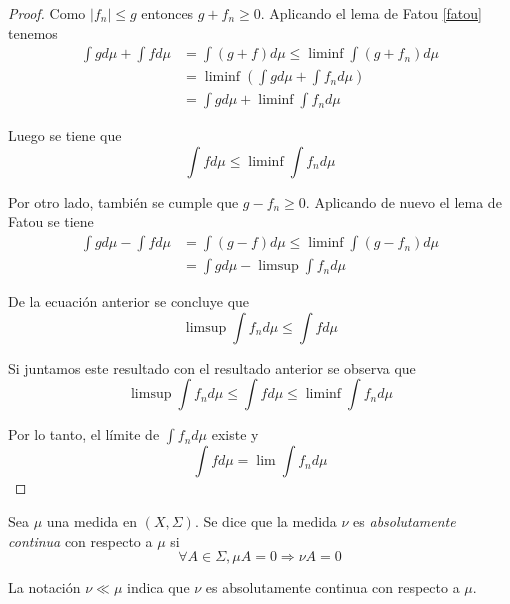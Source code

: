 \begin{proof}
	Como $|f_n| \leq g$ entonces $g + f_n \geq 0$. Aplicando el lema de Fatou \ref{fatou} tenemos
	\begin{align}
		\int g d\mu + \int f d\mu &= \int (g+f) d\mu \leq \liminf \int (g+f_n) d\mu\\
		&= \liminf \left( \int g d\mu + \int f_n d\mu \right)\\
		&= \int g d\mu + \liminf \int f_n d\mu
	\end{align}
	
	Luego se tiene que
	\begin{equation}
		\int f d\mu \leq \liminf \int f_n d\mu
	\end{equation}
	
	Por otro lado, también se cumple que $g - f_n \geq 0$. Aplicando de nuevo el lema de Fatou se tiene
	\begin{align}
		\int g d\mu - \int f d\mu &= \int (g-f) d\mu \leq \liminf \int (g - f_n) d\mu\\
		&= \int g d\mu - \limsup \int f_n d\mu
	\end{align}
	
	De la ecuación anterior se concluye que
	\begin{equation}
		\limsup \int f_n d\mu \leq \int f d\mu
	\end{equation}
	
	Si juntamos este resultado con el resultado anterior se observa que
	\begin{equation}
		\limsup \int f_n d\mu \leq \int f d\mu \leq \liminf \int f_n d\mu
	\end{equation}
	
	Por lo tanto, el límite de $\int f_n d\mu$ existe y
	\begin{equation}
		\int f d\mu = \lim \int f_n d\mu
	\end{equation}
\end{proof}

\begin{definicion}
	Sea $\mu$ una medida en $(X,\Sigma)$. Se dice que la medida $\nu$ es \textit{absolutamente continua} con respecto a $\mu$ si	
	\begin{equation}
		\forall A \in \Sigma, \mu A = 0 \Rightarrow \nu A = 0
	\end{equation}
	
	La notación $\nu \ll \mu$ indica que $\nu$ es absolutamente continua con respecto a $\mu$.
\end{definicion}

